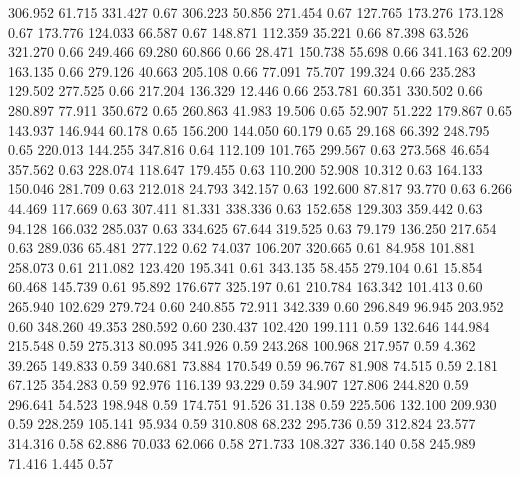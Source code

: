  306.952   61.715  331.427         0.67
 306.223   50.856  271.454         0.67
 127.765  173.276  173.128         0.67
 173.776  124.033   66.587         0.67
 148.871  112.359   35.221         0.66
  87.398   63.526  321.270         0.66
 249.466   69.280   60.866         0.66
  28.471  150.738   55.698         0.66
 341.163   62.209  163.135         0.66
 279.126   40.663  205.108         0.66
  77.091   75.707  199.324         0.66
 235.283  129.502  277.525         0.66
 217.204  136.329   12.446         0.66
 253.781   60.351  330.502         0.66
 280.897   77.911  350.672         0.65
 260.863   41.983   19.506         0.65
  52.907   51.222  179.867         0.65
 143.937  146.944   60.178         0.65
 156.200  144.050   60.179         0.65
  29.168   66.392  248.795         0.65
 220.013  144.255  347.816         0.64
 112.109  101.765  299.567         0.63
 273.568   46.654  357.562         0.63
 228.074  118.647  179.455         0.63
 110.200   52.908   10.312         0.63
 164.133  150.046  281.709         0.63
 212.018   24.793  342.157         0.63
 192.600   87.817   93.770         0.63
   6.266   44.469  117.669         0.63
 307.411   81.331  338.336         0.63
 152.658  129.303  359.442         0.63
  94.128  166.032  285.037         0.63
 334.625   67.644  319.525         0.63
  79.179  136.250  217.654         0.63
 289.036   65.481  277.122         0.62
  74.037  106.207  320.665         0.61
  84.958  101.881  258.073         0.61
 211.082  123.420  195.341         0.61
 343.135   58.455  279.104         0.61
  15.854   60.468  145.739         0.61
  95.892  176.677  325.197         0.61
 210.784  163.342  101.413         0.60
 265.940  102.629  279.724         0.60
 240.855   72.911  342.339         0.60
 296.849   96.945  203.952         0.60
 348.260   49.353  280.592         0.60
 230.437  102.420  199.111         0.59
 132.646  144.984  215.548         0.59
 275.313   80.095  341.926         0.59
 243.268  100.968  217.957         0.59
   4.362   39.265  149.833         0.59
 340.681   73.884  170.549         0.59
  96.767   81.908   74.515         0.59
   2.181   67.125  354.283         0.59
  92.976  116.139   93.229         0.59
  34.907  127.806  244.820         0.59
 296.641   54.523  198.948         0.59
 174.751   91.526   31.138         0.59
 225.506  132.100  209.930         0.59
 228.259  105.141   95.934         0.59
 310.808   68.232  295.736         0.59
 312.824   23.577  314.316         0.58
  62.886   70.033   62.066         0.58
 271.733  108.327  336.140         0.58
 245.989   71.416    1.445         0.57
